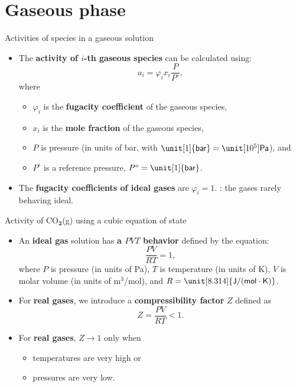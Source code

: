 \section{Gaseous phase}
%
%
\begin{frame}{Activities of species in a gaseous solution}
\begin{itemize}
\item The \alert{\textbf{activity of $i$-th gaseous species}} can be calculated using:
\[
\boxed{a_{i}=\varphi_{i}x_{i}\frac{P}{P^{\circ}}},
\]
where 
\begin{itemize}
\item $\varphi_{i}$ is the \textbf{fugacity coefficient} of the gaseous species,
\item $x_{i}$ is the \textbf{mole fraction} of the gaseous species,
\item $P$ is pressure (in units of bar, with $\unit[1]{\mathsf{bar}}=\unit[10^{5}]{\mathsf{Pa}}$),
and 
\item $P^{\circ}$ is a reference pressure, $P^{\circ}=\unit[1]{\mathsf{bar}}$.
\end{itemize}
\pause
\item The \textbf{fugacity coefficients of ideal gases} are $\varphi_{i}=1$. : the gases rarely behaving ideal.  
\end{itemize}
\end{frame}
%
%
\begin{frame}{Activity of CO$_{\boldsymbol{2}}$(g) using a cubic equation of state}
\begin{itemize}[<+->]
\item An \textbf{ideal gas} solution has \alert{\textbf{a $PVT$ behavior}} defined by the equation:
\[
\frac{PV}{RT}=1,
\]
where $P$ is pressure (in units of Pa), $T$ is temperature (in units
of K), $V$ is molar volume (in units of m$^{3}$/mol), and $R=\unit[8.314]{\mathsf{J/(mol\cdot K)}}$.
\item For \textbf{real gases}, we introduce a \alert{\textbf{compressibility factor}} $Z$ defined as
%
\[
Z=\frac{PV}{RT} < 1.
\]
\item For \textbf{real gases}, $Z \to 1$ only when
\begin{itemize}
\item temperatures are very high or
\item pressures are very low.
\end{itemize}
\end{itemize}
\end{frame}
